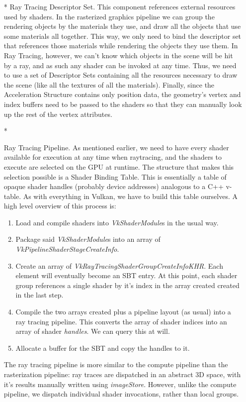 \begin{itemize}
  \item[*] {Ray Tracing Descriptor Set. This component references external resources used by shaders. In the rasterized graphics pipeline we can group the rendering objects by the materials they use, and draw all the objects that use some materials all together. This way, we only need to bind the descriptor set that references those materials while rendering the objects they use them. In Ray Tracing, however, we can't know which objects in the scene will be hit by a ray, and as such any shader can be invoked at any time. Thus, we need to use a set of Descriptor Sets containing all the resources necessary to draw the scene (like all the textures of all the materials). Finally, since the Acceleration Structure contains only position data, the geometry's vertex and index buffers need to be passed to the shaders so that they can manually look up the rest of the vertex attributes.}
  \item[*]{Ray Tracing Pipeline. As mentioned earlier, we need to have every shader available for execution at any time when raytracing, and the shaders to execute are selected on the GPU at runtime. The structure that makes this selection possible is a Shader Binding Table. This is essentially a table of opaque shader handles (probably device addresses) analogous to a C++ v-table. As with everything in Vulkan, we have to build this table ourselves. A high level overview of this process is:
    \begin{enumerate}
      \item Load and compile shaders into \textit{VkShaderModule}s in the usual way.
      \item Package said \textit{VkShaderModule}s into an array of \textit{VkPipelineShaderStageCreateInfo}.
      \item Create an array of \textit{VkRayTracingShaderGroupCreateInfoKHR}. Each element will eventually become an SBT entry. At this point, each shader group references a single shader by it's index in the array created created in the last step.
      \item Compile the two arrays created plus a pipeline layout (as usual) into a ray tracing pipeline. This converts the array of shader indices into an array of shader \textit{handles}. We can query this at will.
      \item Allocate a buffer for the SBT and copy the handles to it.
    \end{enumerate}

    The ray tracing pipeline is more similar to the compute pipeline than the rasterization pipeline: ray traces are dispatched in an abstract 3D space, with it's results manually written using \textit{imageStore}. However, unlike the compute pipeline, we dispatch individual shader invocations, rather than local groups.

}
\end{itemize}
